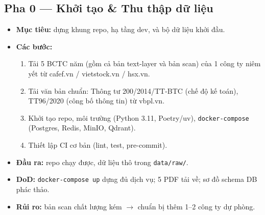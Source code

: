 \documentclass[11pt,a4paper]{article}
\newcommand{\pha}[1]{\subsection{#1}}
\begin{document}
\pha{Pha 0 --- Khởi tạo \& Thu thập dữ liệu}
\begin{itemize}
  \item \textbf{Mục tiêu:} dựng khung repo, hạ tầng dev, và bộ dữ liệu khởi đầu.
  \item \textbf{Các bước:}
  \begin{enumerate}
    \item Tải 5 BCTC năm (gồm cả bản text-layer và bản scan) của 1 công ty niêm yết từ cafef.vn / vietstock.vn / hsx.vn.
    \item Tải văn bản chuẩn: Thông tư 200/2014/TT-BTC (chế độ kế toán), TT96/2020 (công bố thông tin) từ vbpl.vn.
    \item Khởi tạo repo, môi trường (Python 3.11, Poetry/uv), \texttt{docker-compose} (Postgres, Redis, MinIO, Qdrant).
    \item Thiết lập CI cơ bản (lint, test, pre-commit).
  \end{enumerate}
  \item \textbf{Đầu ra:} repo chạy được, dữ liệu thô trong \texttt{data/raw/}.
  \item \textbf{DoD:} \texttt{docker-compose up} dựng đủ dịch vụ; 5 PDF tải về; sơ đồ schema DB phác thảo.
  \item \textbf{Rủi ro:} bản scan chất lượng kém $\rightarrow$ chuẩn bị thêm 1--2 công ty dự phòng.
\end{itemize}
\end{document}
